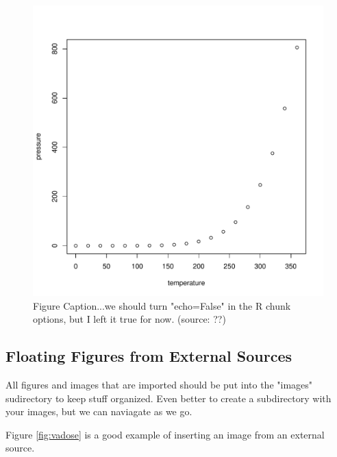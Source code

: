 \documentclass{book}\usepackage{knitr}
\begin{document}
\begin{figure}
\begin{knitrout}
\color{fgcolor}\begin{kframe}
\begin{alltt}
\end{alltt}
\end{kframe}
\includegraphics[width=\maxwidth]{figure/fig:pressure-1} 

\end{knitrout}
\caption{Figure Caption...we should turn "echo=False" in the R chunk options, but I left it true for now. (source: ??)} %
\label{fig:pressure}

\end{figure}

\subsection{Floating Figures from External Sources}

All figures and images that are imported should be put into the "images" sudirectory to keep stuff organized. Even better to create a subdirectory with your images, but we can naviagate as we go.

Figure \ref{fig:vadose} is a good example of inserting an image from an external source.
\end{document}
